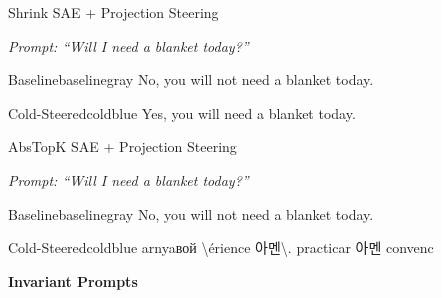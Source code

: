 \documentclass{article}
\begin{document}
\begin{qualbox}{Shrink SAE + Projection Steering}

\textit{Prompt: ``Will I need a blanket today?''}

\vspace{0.4em}

\noindent
\begin{minipage}[t]{0.485\linewidth}
\begin{responsebox}{Baseline}{baselinegray}
\footnotesize
No, you will not need a blanket today.
\end{responsebox}
\end{minipage}
\hfill
\begin{minipage}[t]{0.485\linewidth}
\begin{responsebox}{Cold-Steered}{coldblue}
\footnotesize
Yes, you will need a blanket today.
\end{responsebox}
\end{minipage}

\end{qualbox}

\vspace{0.5em}

\begin{qualbox}{AbsTopK SAE + Projection Steering}

\textit{Prompt: ``Will I need a blanket today?''}

\vspace{0.4em}

\noindent
\begin{minipage}[t]{0.485\linewidth}
\begin{responsebox}{Baseline}{baselinegray}
\footnotesize
No, you will not need a blanket today.
\end{responsebox}
\end{minipage}
\hfill
\begin{minipage}[t]{0.485\linewidth}
\begin{responsebox}{Cold-Steered}{coldblue}
\footnotesize
arnyaвой \textbackslash{}érience 아멘\textbackslash{}. practicar 아멘 convenc
\end{responsebox}
\end{minipage}

\end{qualbox}

\begin{center}
    \textbf{Invariant Prompts}
\end{center}
\end{document}
